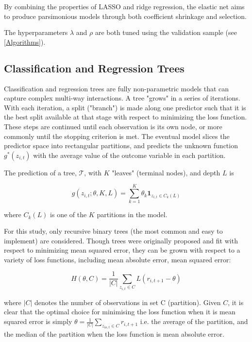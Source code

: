 \documentclass[a4paper, table]{article}
\begin{document}
By combining the properties of LASSO and ridge regression, the elastic net aims to produce parsimonious models through both coefficient shrinkage and selection.

The hyperparameters $\lambda$ and $\rho$ are both tuned using the validation sample (see \ref{Algorithms}). 

\pagebreak

\subsection{Classification and Regression Trees}

Classification and regression trees are fully non-parametric models that can capture complex multi-way interactions. A tree "grows" in a series of iterations. With each iteration, a split ("branch") is made along one predictor such that it is the best split available at that stage with respect to minimizing the loss function. These steps are continued until each observation is its own node, or more commonly until the stopping criterion is met. The eventual model slices the predictor space into rectangular partitions, and predicts the unknown function $g^*(z_{i,t})$ with the average value of the outcome variable in each partition.

The prediction of a tree, $\mathcal{T}$, with \(K\) "leaves" (terminal nodes), and depth $L$ is

\begin{equation}
	g(z_{i,t};\theta,K,L) = \sum_{k=1}^{K}\theta_k\textbf{1}_{z_{i,t}\in C_k(L)}
\end{equation}

where $C_k(L)$ is one of the $K$ partitions in the model.

For this study, only recursive binary trees (the most common and easy to implement) are considered. Though trees were originally proposed and fit with respect to minimizing mean squared error, they can be grown with respect to a variety of loss functions, including mean absolute error, mean squared error:

\begin{equation}
	H(\theta, C) = \frac{1}{|C|} \sum_{z_{i,t} \in C} L(r_{i,t+1} - \theta)
\end{equation}

where $|C|$ denotes the number of observations in set C (partition). Given $C$, it is clear that the optimal choice for minimising the loss function when it is mean squared error is simply $\theta = \frac{1}{|C|} \sum_{z_{io,t}\in C}^{ }r_{i,t+1}$ i.e. the average of the partition, and the median of the partition when the loss function is mean absolute error.
\end{document}
